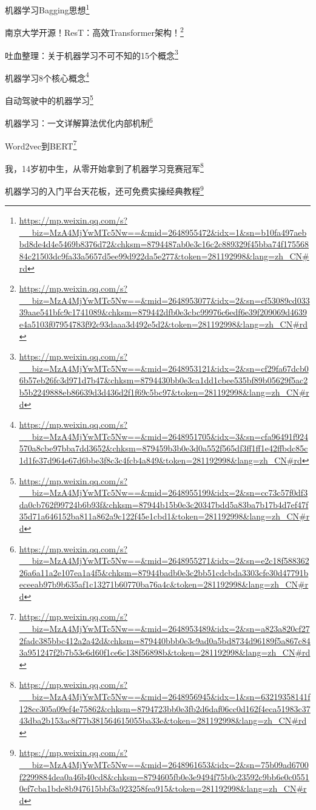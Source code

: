 \documentclass[]{ctexbook}
\renewcommand{\href}[2]{#2\footnote{\url{#1}}}
\begin{document}
\href{https://mp.weixin.qq.com/s?__biz=MzA4MjYwMTc5Nw==\&mid=2648955472\&idx=1\&sn=b10fa497aebbd8de4d4e5469b8376d72\&chksm=8794487ab0e3c16c2c889329f45bba74f17556884c21503dc9fa33a5657d5ee99d922da5e277\&token=281192998\&lang=zh_CN\#rd}{机器学习Bagging思想}

\href{https://mp.weixin.qq.com/s?__biz=MzA4MjYwMTc5Nw==\&mid=2648953077\&idx=2\&sn=cf53089cd03339aae541bfc9c1741089\&chksm=879442dfb0e3cbc99976c6edf6e39f209069d4639e4a5103f07954783f92c93daaa3d492e5d2\&token=281192998\&lang=zh_CN\#rd}{南京大学开源！ResT：高效Transformer架构！}

\href{https://mp.weixin.qq.com/s?__biz=MzA4MjYwMTc5Nw==\&mid=2648953121\&idx=2\&sn=cf29fa67dcb06b57eb26fc3d971d7b47\&chksm=8794430bb0e3ca1dd1cbee535bf89b05629f5ac2b5b2249888eb86639d3d436d2f1f69c5bc97\&token=281192998\&lang=zh_CN\#rd}{吐血整理：关于机器学习不可不知的15个概念}

\href{https://mp.weixin.qq.com/s?__biz=MzA4MjYwMTc5Nw==\&mid=2648951705\&idx=3\&sn=cfa96491f924570a8cbe97bba7dd3652\&chksm=879459b3b0e3d0a552f565df3ff1ff1e42ffbdc85c1d1fe37d964e67d6bbe3f8c3c4fcb4a849\&token=281192998\&lang=zh_CN\#rd}{机器学习8个核心概念}

\href{https://mp.weixin.qq.com/s?__biz=MzA4MjYwMTc5Nw==\&mid=2648955199\&idx=2\&sn=cc73c57f0df3da0cb762f99724b6b93f\&chksm=87944b15b0e3c20347bdd5a83ba7b17b4d7ef47f35d71a646152ba811a862a9c122f45e1cbd1\&token=281192998\&lang=zh_CN\#rd}{自动驾驶中的机器学习}

\href{https://mp.weixin.qq.com/s?__biz=MzA4MjYwMTc5Nw==\&mid=2648955271\&idx=2\&sn=e2c18f58836226a6a11a2e107ea1a4f5\&chksm=87944badb0e3c2bb51cdcbda3303cfe30d47791beceeab97b9b635af1c13271b60770ba76a4c\&token=281192998\&lang=zh_CN\#rd}{机器学习：一文详解算法优化内部机制}

\href{https://mp.weixin.qq.com/s?__biz=MzA4MjYwMTc5Nw==\&mid=2648953489\&idx=2\&sn=a823a820cf272fadc385bbc412a2a42d\&chksm=879440bbb0e3c9ad0a5bd8734d96189f5a867c843a951247f2b7b53e6d60f1ce6c138f56898b\&token=281192998\&lang=zh_CN\#rd}{Word2vec到BERT}

\href{https://mp.weixin.qq.com/s?__biz=MzA4MjYwMTc5Nw==\&mid=2648956945\&idx=1\&sn=63219358141f128cc305a09ef4e75862\&chksm=8794723bb0e3fb2d6daf06cc0d162f4eca51983c3743dba2b153ac8f77b381564615055ba33e\&token=281192998\&lang=zh_CN\#rd}{我，14岁初中生，从零开始拿到了机器学习竞赛冠军}

\href{https://mp.weixin.qq.com/s?__biz=MzA4MjYwMTc5Nw==\&mid=2648961653\&idx=2\&sn=75b09ad6700f2299884dea0a46b40cd8\&chksm=8794605fb0e3e9494f75b0c23592c9bb6e0c05510ef7cba1bde8b947615bbf3a923258fea915\&token=281192998\&lang=zh_CN\#rd}{机器学习的入门平台天花板，还可免费实操经典教程}
\end{document}
